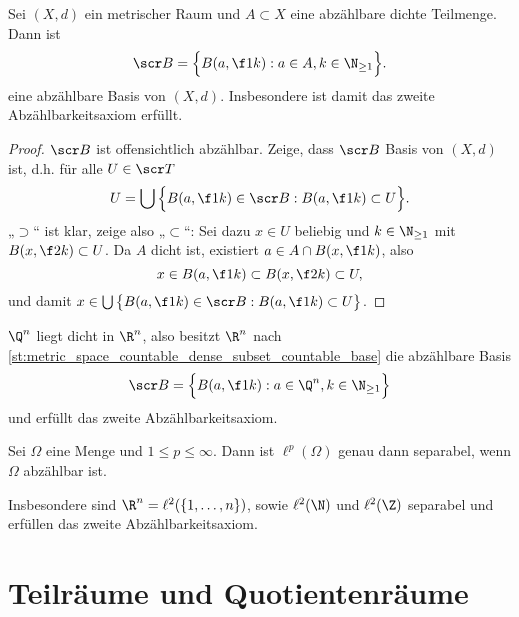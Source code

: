 \begin{st} \label{st:metric_space_countable_dense_subset_countable_base}
	Sei $(X,d)$ ein metrischer Raum und $A \subset X$ eine abzählbare dichte Teilmenge.
	Dann ist
	\[
		\scr B = \Big\{ B(a, \f 1k) : a \in A, k \in \N_{\ge 1} \Big\}.
	\]
	eine abzählbare Basis von $(X,d)$.
	Insbesondere ist damit das zweite Abzählbarkeitsaxiom erfüllt.
	\begin{proof}
		$\scr B$ ist offensichtlich abzählbar.
		Zeige, dass $\scr B$ Basis von $(X,d)$ ist, d.h. für alle $U \in \scr T$
		\[
			U = \bigcup \Big\{ B(a, \f 1k) \in \scr B : B(a, \f 1k) \subset U \Big\}.
		\]
		„$\supset$“ ist klar, zeige also „$\subset$“:
		Sei dazu $x \in U$ beliebig und $k \in \N_{\ge 1}$ mit $B(x, \f 2k) \subset U$.
		Da $A$ dicht ist, existiert $a \in A \cap B(x, \f 1k)$, also
		\[
			x \in B(a, \f 1k) \subset B(x, \f 2k) \subset U,
		\]
		und damit $x \in \bigcup \big\{ B(a, \f 1k) \in \scr B : B(a, \f 1k) \subset U \big\}$.
	\end{proof}
\end{st}

\begin{ex}
	$\Q^n$ liegt dicht in $\R^n$, also besitzt $\R^n$ nach \ref{st:metric_space_countable_dense_subset_countable_base} die abzählbare Basis
	\[
		\scr B = \Big\{ B(a, \f 1k) : a \in \Q^n, k \in \N_{\ge 1} \Big\}
	\]
	und erfüllt das zweite Abzählbarkeitsaxiom.
\end{ex}

\begin{st}
	Sei $\Omega$ eine Menge und $1 \le p \le \infty$.
	Dann ist $\ell^p(\Omega)$ genau dann separabel, wenn $\Omega$ abzählbar ist.

	Insbesondere sind $\R^n = \ell^2(\{1, \dotsc, n\})$, sowie $\ell^2(\N)$ und $\ell^2(\Z)$ separabel und erfüllen das zweite Abzählbarkeitsaxiom.
\end{st}


\section{Teilräume und Quotientenräume}


